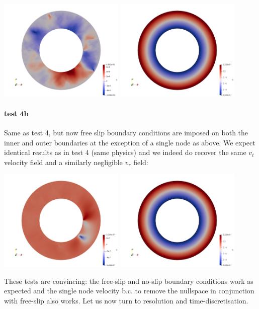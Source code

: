 \begin{center}
\includegraphics[width=6cm]{python_codes/fieldstone_33/results_test4/vr}
\includegraphics[width=6cm]{python_codes/fieldstone_33/results_test4/vt}
\end{center}


\paragraph{test 4b} Same as test 4, but now free slip boundary conditions are imposed on both the 
inner and outer boundaries at the exception of a single node as above. 
We expect identical results as in test 4 (same physics) and we indeed do recover the same
$v_t$ velocity field and a similarly negligible $v_r$ field:

\begin{center}
\includegraphics[width=6cm]{python_codes/fieldstone_33/results_test4b/vr}
\includegraphics[width=6cm]{python_codes/fieldstone_33/results_test4b/vt}
\end{center}

These tests are convincing: the free-slip and no-slip boundary conditions work as expected 
and the single node velocity b.c. to remove the nullspace in conjunction with free-slip also 
works. 
Let us now turn to resolution and time-discretisation. 


